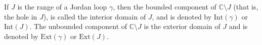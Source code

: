 If $J$ is the range of a Jordan loop $\gamma$, then the bounded component of $\mathbb{C} \setminus J$ (that is, the hole in $J$), is called the interior domain of $J$, and is denoted by $\text{Int}(\gamma)$ or $\text{Int}(J)$. The unbounded component of $\mathbb{C} \setminus J$ is the exterior domain of $J$ and is denoted by $\text{Ext}(\gamma)$ or $\text{Ext}(J)$.
